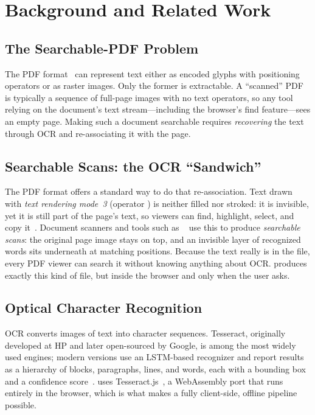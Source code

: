 \section{Background and Related Work}
\label{sec:background}

\subsection{The Searchable-PDF Problem}
The PDF format~\cite{pdf32000} can represent text either as encoded glyphs with
positioning operators or as raster images. Only the former is extractable. A
``scanned'' PDF is typically a sequence of full-page images with no text
operators, so any tool relying on the document's text stream---including the
browser's find feature---sees an empty page. Making such a document searchable
requires \emph{recovering} the text through OCR and re-associating it with the
page.

\subsection{Searchable Scans: the OCR ``Sandwich''}
The PDF format offers a standard way to do that re-association. Text drawn with
\emph{text rendering mode~3} (operator ) is neither filled nor
stroked: it is invisible, yet it is still part of the page's text, so viewers can
find, highlight, select, and copy it~\cite{pdf32000}. Document scanners and tools
such as ~\cite{ocrmypdf} use this to produce \emph{searchable
scans}: the original page image stays on top, and an invisible layer of
recognized words sits underneath at matching positions. Because the text really
is in the file, every PDF viewer can search it without knowing anything about
OCR. \proj{} produces exactly this kind of file, but inside the browser and only
when the user asks.

\subsection{Optical Character Recognition}
OCR converts images of text into character sequences. Tesseract, originally
developed at HP and later open-sourced by Google, is among the most widely used
engines; modern versions use an LSTM-based recognizer and report results as a
hierarchy of blocks, paragraphs, lines, and words, each with a bounding box and a
confidence score~\cite{smith2007tesseract}. \proj{} uses
Tesseract.js~\cite{tesseractjs}, a WebAssembly port that runs entirely in the
browser, which is what makes a fully client-side, offline pipeline possible.

